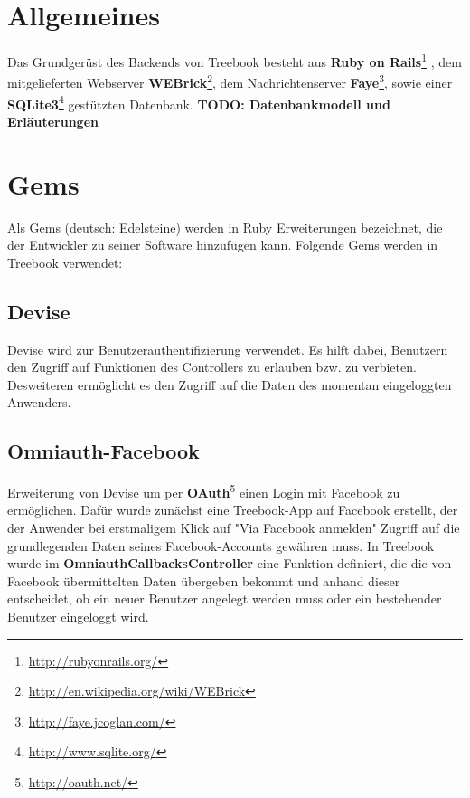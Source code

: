\documentclass[10pt,a4paper]{book}
\begin{document}
\section{Allgemeines}
Das Grundgerüst des Backends von Treebook besteht aus \textbf{Ruby on Rails}\footnote{\href{http://rubyonrails.org/}{http://rubyonrails.org/}}
, dem mitgelieferten Webserver \textbf{WEBrick}\footnote{\href{http://en.wikipedia.org/wiki/WEBrick}{http://en.wikipedia.org/wiki/WEBrick}}, 
dem Nachrichtenserver \textbf{Faye}\footnote{\href{http://faye.jcoglan.com/}{http://faye.jcoglan.com/}}, sowie einer \textbf{SQLite3}\footnote{\href{http://www.sqlite.org/}{http://www.sqlite.org/}} gestützten Datenbank.
\textbf{TODO: Datenbankmodell und Erläuterungen}
\section{Gems}
Als Gems (deutsch: Edelsteine) werden in Ruby Erweiterungen bezeichnet, die der Entwickler zu seiner Software hinzufügen kann. Folgende Gems werden in Treebook verwendet:
\subsection{Devise}
Devise wird zur Benutzerauthentifizierung verwendet. Es hilft dabei, Benutzern den Zugriff auf Funktionen des Controllers zu erlauben bzw. zu verbieten. Desweiteren ermöglicht es den Zugriff auf die Daten des momentan eingeloggten Anwenders.
\subsection{Omniauth-Facebook}
Erweiterung von Devise um per \textbf{OAuth}\footnote{\href{http://oauth.net/}{http://oauth.net/}} einen Login mit Facebook zu ermöglichen. 
Dafür wurde zunächst eine Treebook-App auf Facebook erstellt, der der Anwender bei erstmaligem Klick auf "Via Facebook anmelden" Zugriff auf 
die grundlegenden Daten seines Facebook-Accounts gewähren muss. In Treebook wurde im \textbf{OmniauthCallbacksController} eine Funktion 
definiert, die die von Facebook übermittelten Daten übergeben bekommt und anhand dieser entscheidet, ob ein neuer Benutzer angelegt werden muss oder ein bestehender Benutzer eingeloggt wird.
\end{document}
